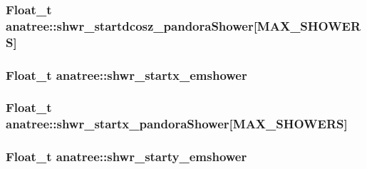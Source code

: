 \hypertarget{classanatree_aa2f9c21b50a61e815117c89f832657d0}{
\subsubsection[{shwr\-\_\-startdcosz\-\_\-pandora\-Shower}]{\setlength{\rightskip}{0pt plus 5cm}Float\-\_\-t anatree\-::shwr\-\_\-startdcosz\-\_\-pandora\-Shower\mbox{[}{\bf M\-A\-X\-\_\-\-S\-H\-O\-W\-E\-R\-S}\mbox{]}}}\label{classanatree_aa2f9c21b50a61e815117c89f832657d0}
\hypertarget{classanatree_a4cc58d005e47a1ca0abd2ef9fd226462}{
\subsubsection[{shwr\-\_\-startx\-\_\-emshower}]{\setlength{\rightskip}{0pt plus 5cm}Float\-\_\-t anatree\-::shwr\-\_\-startx\-\_\-emshower}}\label{classanatree_a4cc58d005e47a1ca0abd2ef9fd226462}
\hypertarget{classanatree_a8ad73ace138eccdebf1dcc157accd27a}{
\subsubsection[{shwr\-\_\-startx\-\_\-pandora\-Shower}]{\setlength{\rightskip}{0pt plus 5cm}Float\-\_\-t anatree\-::shwr\-\_\-startx\-\_\-pandora\-Shower\mbox{[}{\bf M\-A\-X\-\_\-\-S\-H\-O\-W\-E\-R\-S}\mbox{]}}}\label{classanatree_a8ad73ace138eccdebf1dcc157accd27a}
\hypertarget{classanatree_ac370306b31632d3a3790081998d86dae}{
\subsubsection[{shwr\-\_\-starty\-\_\-emshower}]{\setlength{\rightskip}{0pt plus 5cm}Float\-\_\-t anatree\-::shwr\-\_\-starty\-\_\-emshower}}\label{classanatree_ac370306b31632d3a3790081998d86dae}
